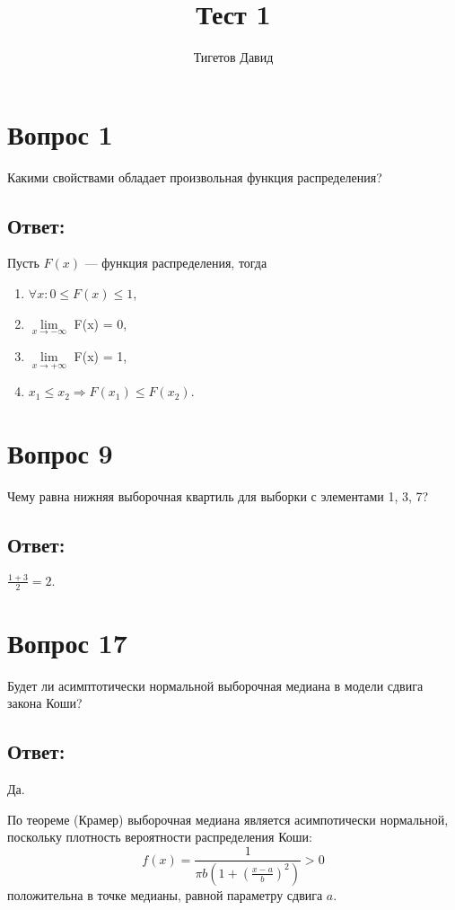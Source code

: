 \documentclass[12pt]{article}
\begin{document}
    \title{Тест 1}
    \author{Тигетов Давид}
    \date{}
    \maketitle

    \section*{Вопрос 1}
    Какими свойствами обладает произвольная функция распределения?

    \subsection*{Ответ:}
    Пусть $F(x)$ --- функция распределения, тогда
    \begin{enumerate}
        \item $\forall x: 0 \le F(x) \le 1$,
        \item $\lim \limits_{x \rightarrow - \infty}$ F(x) = 0,
        \item $\lim \limits_{x \rightarrow + \infty}$ F(x) = 1,
        \item $x_1 \le x_2 \Rightarrow F(x_1) \le F(x_2)$.
    \end{enumerate}

    \section*{Вопрос 9}
    Чему равна нижняя выборочная квартиль для выборки с элементами 1, 3, 7?

    \subsection*{Ответ:}
    $\frac{1+3}{2} = 2.$

    \section*{Вопрос 17}
    Будет ли асимптотически нормальной выборочная медиана в модели сдвига закона Коши?

    \subsection*{Ответ:}
    Да.

    По теореме (Крамер) выборочная медиана является асимпотически нормальной, поскольку плотность вероятности распределения Коши:
    \[
        f(x) = \frac{1}{\pi b \left ( 1 + \left ( \frac{x - a}{b} \right )^2 \right )} > 0
    \]
    положительна в точке медианы, равной параметру сдвига $a$.
\end{document}
